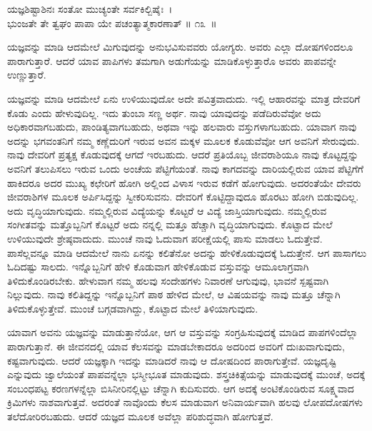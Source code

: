 \begin{shloka}
ಯಜ್ಞಶಿಷ್ಟಾಶಿನಃ ಸಂತೋ ಮುಚ್ಯಂತೇ ಸರ್ವಕಿಲ್ಬಿಷೈಃ~।\\ಭುಂಜತೇ ತೇ ತ್ವಘಂ ಪಾಪಾ ಯೇ ಪಚಂತ್ಯಾತ್ಮಕಾರಣಾತ್ \hfill॥ ೧೩~॥
\end{shloka}

\begin{artha}
ಯಜ್ಞವನ್ನು ಮಾಡಿ ಆದಮೇಲೆ ಮಿಗುವುದನ್ನು ಅನುಭವಿಸುವವರು ಯೋಗ್ಯರು. ಅವರು ಎಲ್ಲಾ ದೋಷಗಳಿಂದಲೂ ಪಾರಾಗುತ್ತಾರೆ. ಆದರೆ ಯಾವ ಪಾಪಿಗಳು ತಮಗಾಗಿ ಅಡುಗೆಯನ್ನು ಮಾಡಿಕೊಳ್ಳುತ್ತಾರೊ ಅವರು ಪಾಪವನ್ನೇ ಉಣ್ಣುತ್ತಾರೆ.
\end{artha}

ಯಜ್ಞವನ್ನು ಮಾಡಿ ಆದಮೇಲೆ ಏನು ಉಳಿಯುವುದೋ ಅದೇ ಪವಿತ್ರವಾದುದು. ಇಲ್ಲಿ ಆಹಾರವನ್ನು ಮಾತ್ರ ದೇವರಿಗೆ ಕೊಡು ಎಂದು ಹೇಳುವುದಿಲ್ಲ. ಇದು ತುಂಬಾ ಸಣ್ಣ ಅರ್ಥ. ನಾವು ಯಾವುದನ್ನು ಪಡೆದಿರುವೆವೋ ಅದು ಅಧಿಕಾರವಾಗಬಹುದು, ಪಾಂಡಿತ್ಯವಾಗಬಹುದು, ಅಥವಾ ಇನ್ನು ಹಲವಾರು ವಸ್ತುಗಳಾಗಬಹುದು. ಯಾವಾಗ ನಾವು ಅದನ್ನು ಭಗವಂತನಿಗೆ ನಮ್ಮ ಕಣ್ಣೆದುರಿಗೆ ಇರುವ ಅವನ ಮಕ್ಕಳ ಮೂಲಕ ಕೊಡುವೆವೋ ಆಗ ಅವನಿಗೆ ಸೇರುವುದು. ನಾವು ದೇವರಿಗೆ ಪ್ರತ್ಯಕ್ಷ ಕೊಡುವುದಕ್ಕೆ ಆಗದೆ ಇರಬಹುದು. ಆದರೆ ಪ್ರತಿಯೊಬ್ಬ ಜೀವರಾಶಿಯೂ ನಾವು ಕೊಟ್ಟದ್ದನ್ನು ಅವನಿಗೆ ತಲುಪಿಸಲು ಇರುವ ಒಂದು ಅಂಚೆಯ ಪೆಟ್ಟಿಗೆಯಂತೆ. ನಾವು ಕಾಗದವನ್ನು ದಾರಿಯಲ್ಲಿರುವ ಯಾವ ಪೆಟ್ಟಿಗೆಗೆ ಹಾಕಿದರೂ ಅದರ ಮುಖ್ಯ ಕಛೇರಿಗೆ ಹೋಗಿ ಅಲ್ಲಿಂದ ವಿಳಾಸ ಇರುವ ಕಡೆಗೆ ಹೋಗುವುದು. ಅದರಂತೆಯೇ ದೇವರು ಜೀವರಾಶಿಗಳ ಮೂಲಕ ಅರ್ಪಿಸಿದ್ದನ್ನು ಸ್ವೀಕರಿಸುವನು. ದೇವರಿಗೆ ಕೊಟ್ಟಿದ್ದಾವುದೂ ಹೊರಟು ಹೋಗಿ ಬಿಡುವುದಿಲ್ಲ. ಅದು ವೃದ್ಧಿಯಾಗುವುದು. ನಮ್ಮಲ್ಲಿರುವ ವಿದ್ಯೆಯನ್ನು ಕೊಟ್ಟರೆ ಆ ವಿದ್ಯೆ ಜಾಸ್ತಿಯಾಗುವುದು. ನಮ್ಮಲ್ಲಿರುವ ಸಂಗೀತವನ್ನು ಮತ್ತೊಬ್ಬನಿಗೆ ಕೊಟ್ಟರೆ ಅದು ನನ್ನಲ್ಲಿ ಮತ್ತೂ ಹೆಚ್ಚಾಗಿ ವೃದ್ಧಿಯಾಗುವುದು. ಕೊಟ್ಟಾದ ಮೇಲೆ ಉಳಿಯುವುದೇ ಶ್ರೇಷ್ಠವಾದುದು. ಮುಂಚೆ ನಾವು ಓದುವಾಗ ಪರೀಕ್ಷೆಯಲ್ಲಿ ಪಾಸು ಮಾಡಲು ಓದುತ್ತೇವೆ. ಪಾಸೆಲ್ಲವನ್ನೂ ಮಾಡಿ ಆದಮೇಲೆ ನಾನು ಏನನ್ನು ಕಲಿತೆನೋ ಅದನ್ನು ಹೇಳಿಕೊಡುವುದಕ್ಕೆ ಓದುತ್ತೇನೆ. ಆಗ ಪಾಸಾಗಲು ಓದಿದಷ್ಟು ಸಾಲದು. ಇನ್ನೊಬ್ಬನಿಗೆ ಹೇಳಿ ಕೊಡುವಾಗ ಹೇಳಿಕೊಡುವ ವಸ್ತುವನ್ನು ಆಮೂಲಾಗ್ರವಾಗಿ ತಿಳಿದುಕೊಂಡಿರಬೇಕು. ಹೇಳುವಾಗ ನಮ್ಮ ಹಲವು ಸಂದೇಹಗಳು ನಿವಾರಣೆ ಆಗುವುವು, ಭಾವನೆ ಸ್ಪಷ್ಟವಾಗಿ ನಿಲ್ಲುವುದು. ನಾವು ಕಲಿತಿದ್ದನ್ನು ಇನ್ನೊಬ್ಬನಿಗೆ ಪಾಠ ಹೇಳಿದ ಮೇಲೆ, ಆ ವಿಷಯವನ್ನು ನಾವು ಮತ್ತೂ ಚೆನ್ನಾಗಿ ತಿಳಿದುಕೊಳ್ಳುತ್ತೇವೆ. ಮುಂಚೆ ಬಗ್ಗಡವಾಗಿದ್ದು, ಕೊಟ್ಟಾದ ಮೇಲೆ ತಿಳಿಯಾಗುವುದು.

ಯಾವಾಗ ಅವನು ಯಜ್ಞವನ್ನು ಮಾಡುತ್ತಾನೆಯೋ, ಆಗ ಆ ವಸ್ತುವನ್ನು ಸಂಗ್ರಹಿಸುವುದಕ್ಕೆ ಮಾಡಿದ ಪಾಪಗಳಿಂದೆಲ್ಲಾ ಪಾರಾಗುತ್ತಾನೆ. ಈ ಜೀವನದಲ್ಲಿ ಯಾವ ಕೆಲಸವನ್ನು ಮಾಡಬೇಕಾ\-ದರೂ ಅದರಿಂದ ಅವರಿಗೆ ದುಃಖವಾಗುವುದು, ಕಷ್ಟವಾಗುವುದು. ಆದರೆ ಯಜ್ಞಕ್ಕಾಗಿ ಇದನ್ನು ಮಾಡಿದರೆ ನಾವು ಆ ದೋಷದಿಂದ ಪಾರಾಗುತ್ತೇವೆ. ಯಜ್ಞದೃಷ್ಟಿ ಎನ್ನುವುದು ಜ್ವಾಲೆಯಂತೆ ಪಾಪವನ್ನೆಲ್ಲಾ ಭಸ್ಮೀಭೂತ ಮಾಡುವುದು. ಶಸ್ತ್ರಚಿಕಿತ್ಸೆಯನ್ನು ಮಾಡುವುದಕ್ಕೆ ಮುಂಚೆ, ಅದಕ್ಕೆ ಸಂಬಂಧಪಟ್ಟ ಕರಣಗಳನ್ನೆಲ್ಲಾ ಬಿಸಿನೀರಿನಲ್ಲಿಟ್ಟು ಚೆನ್ನಾಗಿ ಕುದಿಸುವರು. ಆಗ ಅದಕ್ಕೆ ಅಂಟಿ\-ಕೊಂಡಿರುವ ಸೂಕ್ಷ್ಮವಾದ ಕ್ರಿಮಿಗಳು ನಾಶವಾಗುತ್ತವೆ. ಅದರಂತೆ ನಾವೊಂದು ಕೆಲಸ ಮಾಡುವಾಗ ಅನಿವಾರ್ಯವಾಗಿ ಹಲವು ಲೋಪದೋಷಗಳು ತಲೆದೋರಿರಬಹುದು. ಆದರೆ ಯಜ್ಞದ ಮೂಲಕ ಅವೆಲ್ಲಾ ಪರಿಶುದ್ಧವಾಗಿ ಹೋಗುತ್ತವೆ.

